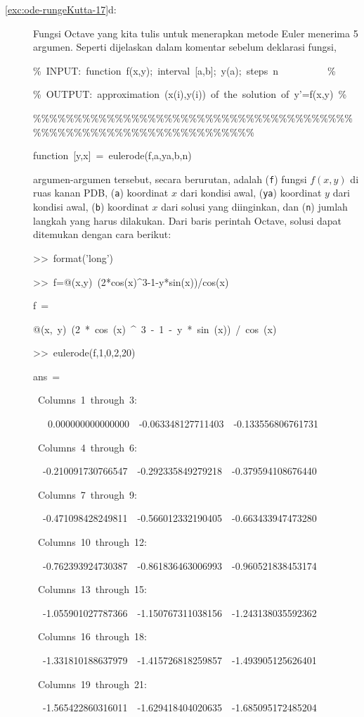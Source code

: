 \begin{description}
\item [{\ref{exc:ode-rungeKutta-17}d:}] Fungsi Octave yang kita tulis
untuk menerapkan metode Euler menerima 5 argumen. Seperti dijelaskan
dalam komentar sebelum deklarasi fungsi,

\begin{lyxcode}
\%~INPUT:~function~f(x,y);~interval~{[}a,b{]};~y(a);~steps~n~~~~~~~~~~\%

\%~OUTPUT:~approximation~(x(i),y(i))~of~the~solution~of~y'=f(x,y)~\%

\%\%\%\%\%\%\%\%\%\%\%\%\%\%\%\%\%\%\%\%\%\%\%\%\%\%\%\%\%\%\%\%\%\%\%\%\%\%\%\%\%\%\%\%\%\%\%\%\%\%\%\%\%\%\%\%\%\%\%\%\%\%\%\%\%\%

function~{[}y,x{]}~=~eulerode(f,a,ya,b,n)~
\end{lyxcode}
argumen-argumen tersebut, secara berurutan, adalah (\texttt{f}) fungsi
$f(x,y)$ di ruas kanan PDB, (\texttt{a}) koordinat $x$ dari kondisi
awal, (\texttt{ya}) koordinat $y$ dari kondisi awal, (\texttt{b})
koordinat $x$ dari solusi yang diinginkan, dan (\texttt{n}) jumlah
langkah yang harus dilakukan. Dari baris perintah Octave, solusi dapat
ditemukan dengan cara berikut:
\begin{lyxcode}
>\textcompwordmark >~format('long')

>\textcompwordmark >~f=@(x,y)~(2{*}cos(x)\textasciicircum 3-1-y{*}sin(x))/cos(x)

f~=

@(x,~y)~(2~{*}~cos~(x)~\textasciicircum ~3~-~1~-~y~{*}~sin~(x))~/~cos~(x)

>\textcompwordmark >~eulerode(f,1,0,2,20)

ans~=

~Columns~1~through~3:

~~~0.000000000000000~~-0.063348127711403~~-0.133556806761731

~Columns~4~through~6:

~~-0.210091730766547~~-0.292335849279218~~-0.379594108676440

~Columns~7~through~9:

~~-0.471098428249811~~-0.566012332190405~~-0.663433947473280

~Columns~10~through~12:

~~-0.762393924730387~~-0.861836463006993~~-0.960521838453174

~Columns~13~through~15:

~~-1.055901027787366~~-1.150767311038156~~-1.243138035592362

~Columns~16~through~18:

~~-1.331810188637979~~-1.415726818259857~~-1.493905125626401

~Columns~19~through~21:

~~-1.565422860316011~~-1.629418404020635~~-1.685095172485204
\end{lyxcode}
\end{description}
